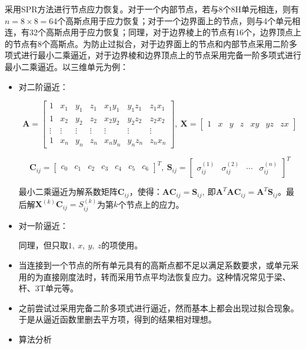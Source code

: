 \documentclass[UTF8]{ctexbook}
\begin{document}
采用SPR方法进行节点应力恢复。对于一个内部节点，若与8个8H单元相连，则有$n=8\times8=64$个高斯点用于应力恢复；对于一个边界面上的节点，则与4个单元相连，有32个高斯点用于应力恢复；同理，对于边界棱上的节点有16个，边界顶点上的节点有8个高斯点。为防止过拟合，对于边界面上的节点和内部节点采用二阶多项式进行最小二乘逼近，对于边界棱和边界顶点上的节点采用完备一阶多项式进行最小二乘逼近。以三维单元为例：
\begin{itemize}
\item 对二阶逼近：


\[
\boldsymbol{A}=\begin{bmatrix}1 & x_{1} & y_{1} & z_{1} & x_{1}y_{1} & y_{1}z_{1} & z_{1}x_{1}\\
1 & x_{2} & y_{2} & z_{2} & x_{2}y_{2} & y_{2}z_{2} & z_{2}x_{2}\\
\vdots & \vdots & \vdots & \vdots & \vdots & \vdots & \vdots\\
1 & x_{n} & y_{n} & z_{n} & x_{n}y_{n} & y_{n}z_{n} & z_{n}x_{n}
\end{bmatrix},\ \boldsymbol{X}=\begin{bmatrix}1 & x & y & z & xy & yz & zx\end{bmatrix}
\]



\[
\boldsymbol{C}_{ij}=\begin{bmatrix}c_{0} & c_{1} & c_{2} & c_{3} & c_{4} & c_{5} & c_{6}\end{bmatrix}^{T},\ \boldsymbol{S}_{ij}=\begin{bmatrix}\sigma_{ij}^{(1)} & \sigma_{ij}^{(2)} & \cdots & \sigma_{ij}^{(n)}\end{bmatrix}^{T}
\]



最小二乘逼近为解系数矩阵$\boldsymbol{C}_{ij}$，使得：$\boldsymbol{AC}_{ij}=\boldsymbol{S}_{ij},\ \text{即}\boldsymbol{A}^{T}\boldsymbol{AC}_{ij}=\boldsymbol{A}^{T}\boldsymbol{S}_{ij}$。最后解$\boldsymbol{X}^{(k)}\boldsymbol{C}_{ij}=S_{ij}^{(k)}$为第$k$个节点上的应力。

\item 对一阶逼近：


同理，但只取$1,\ x,\ y,\ z$的项使用。

\item 当连接到一个节点的所有单元具有的高斯点都不足以满足系数要求，或单元采用的为直接刚度法时，转而采用节点平均法恢复应力。这种情况常见于梁、杆、3T单元等。
\item 之前尝试过采用完备二阶多项式进行逼近，然而基本上都会出现过拟合现象。于是从逼近函数里删去平方项，得到的结果相对理想。
\item 算法分析


\end{itemize}
\end{document}
